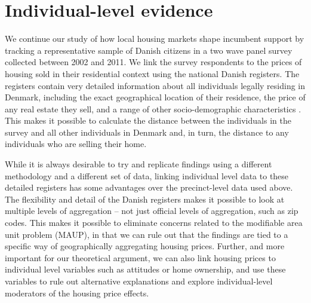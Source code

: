 \documentclass[12pt,a4paper]{article}
\begin{document}
\section{Individual-level evidence}\label{individuallevel}
We continue our study of how local housing markets shape incumbent support by tracking a representative sample of Danish citizens in a two wave panel survey collected between 2002 and 2011. We link the survey respondents to the prices of housing sold in their residential context using the national Danish registers. The registers contain very detailed information about all individuals legally residing in Denmark, including the exact geographical location of their residence, the price of any real estate they sell, and a range of other socio-demographic characteristics \citep{thygesen2011introduction}. This makes it possible to calculate the distance between the individuals in the survey and all other individuals in Denmark and, in turn, the distance to any individuals who are selling their home. 
 
 While it is always desirable to try and replicate findings using a different methodology and a different set of data, linking individual level data to these detailed registers has some advantages over the precinct-level data used above. The flexibility and detail of the Danish registers makes it possible to look at multiple levels of aggregation -- not just official levels of aggregation, such as zip codes. This makes it possible to eliminate concerns related to the modifiable area unit problem (MAUP), in that we can rule out that the findings are tied to a specific way of geographically aggregating housing prices. Further, and more important for our theoretical argument, we can also link housing prices to individual level variables such as attitudes or home ownership, and use these variables to rule out alternative explanations and explore individual-level moderators of the housing price effects.
\end{document}
